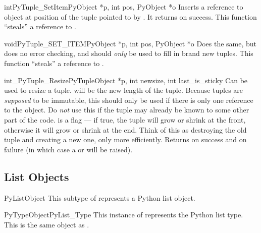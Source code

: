 \documentclass{manual}
\begin{document}
\begin{cfuncdesc}{int}{PyTuple_SetItem}{PyObject *p,
                                        int pos, PyObject *o}
Inserts a reference to object  at position  of
the tuple pointed to by . It returns  on success.
  This function ``steals'' a reference to .
\end{cfuncdesc}

\begin{cfuncdesc}{void}{PyTuple_SET_ITEM}{PyObject *p,
                                          int pos, PyObject *o}
Does the same, but does no error checking, and
should \emph{only} be used to fill in brand new tuples.
  This function ``steals'' a reference to .
\end{cfuncdesc}

\begin{cfuncdesc}{int}{_PyTuple_Resize}{PyTupleObject *p,
                                        int newsize, int last_is_sticky}
Can be used to resize a tuple.   will be the new length
of the tuple.  Because tuples are \emph{supposed} to be immutable,
this should only be used if there is only one reference to the object.
Do \emph{not} use this if the tuple may already be known to some other
part of the code.   is a flag --- if true, the
tuple will grow or shrink at the front, otherwise it will grow or
shrink at the end.  Think of this as destroying the old tuple and
creating a new one, only more efficiently.  Returns  on
success and  on failure (in which case a
 or  will be raised).
\end{cfuncdesc}


\subsection{List Objects \label{listObjects}}

\begin{ctypedesc}{PyListObject}
This subtype of  represents a Python list object.
\end{ctypedesc}

\begin{cvardesc}{PyTypeObject}{PyList_Type}
This instance of  represents the Python list
type.  This is the same object as .
\end{cvardesc}
\end{document}

